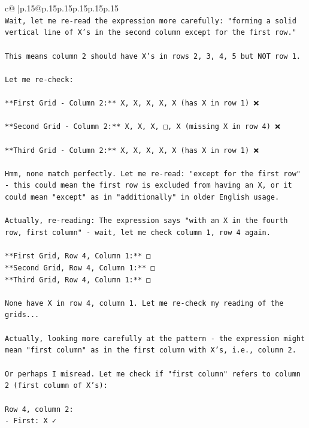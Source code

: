 \documentclass{article}
\begin{document}
{\begin{supertabular}{c@{$\;$}|p{.15\linewidth}@{}p{.15\linewidth}p{.15\linewidth}p{.15\linewidth}p{.15\linewidth}p{.15\linewidth}}
{{{\\ 
\texttt{Wait, let me re{-}read the expression more carefully: "forming a solid vertical line of X's in the second column except for the first row."} \\
\\ 
\texttt{This means column 2 should have X's in rows 2, 3, 4, 5 but NOT row 1.} \\
\\ 
\texttt{Let me re{-}check:} \\
\\ 
\texttt{**First Grid {-} Column 2:** X, X, X, X, X (has X in row 1) ❌} \\
\\ 
\texttt{**Second Grid {-} Column 2:** X, X, X, □, X (missing X in row 4) ❌} \\
\\ 
\texttt{**Third Grid {-} Column 2:** X, X, X, X, X (has X in row 1) ❌} \\
\\ 
\texttt{Hmm, none match perfectly. Let me re{-}read: "except for the first row" {-} this could mean the first row is excluded from having an X, or it could mean "except" as in "additionally" in older English usage.} \\
\\ 
\texttt{Actually, re{-}reading: The expression says "with an X in the fourth row, first column" {-} wait, let me check column 1, row 4 again.} \\
\\ 
\texttt{**First Grid, Row 4, Column 1:** □ } \\
\texttt{**Second Grid, Row 4, Column 1:** □ } \\
\texttt{**Third Grid, Row 4, Column 1:** □ } \\
\\ 
\texttt{None have X in row 4, column 1. Let me re{-}check my reading of the grids...} \\
\\ 
\texttt{Actually, looking more carefully at the pattern {-} the expression might mean "first column" as in the first column with X's, i.e., column 2.} \\
\\ 
\texttt{Or perhaps I misread. Let me check if "first column" refers to column 2 (first column of X's):} \\
\\ 
\texttt{Row 4, column 2:} \\
\texttt{{-} First: X ✓} \\
}}}
\end{supertabular}}
\end{document}
